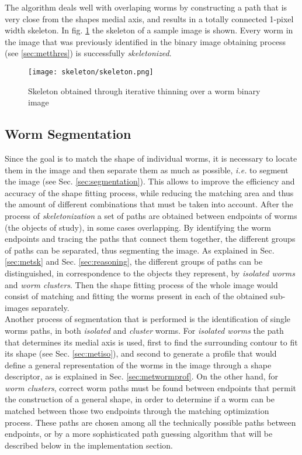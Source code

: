 The algorithm deals well with overlaping worms by constructing a path that is very close
from the shapes medial axis, and results in a totally connected 1-pixel width skeleton.
In fig. \ref{fig:skeleton} the skeleton of a sample image is shown. Every worm in the 
image that was previously identified in the binary image obtaining process 
(see \ref{sec:metthres}) is successfully \emph{skeletonized}.

\begin{figure}[h t b p ! H]
 \centering
   \texttt{[image: skeleton/skeleton.png]}
 \caption{Skeleton obtained through iterative thinning over a worm binary image}
\label{fig:skeleton}
\end{figure} 


\subsection{Worm Segmentation}
\label{sec:metsegmentation}

Since the goal is to match the shape of individual worms,
it is necessary to locate them in the image and then separate them 
as much as possible, \emph{i.e.} to segment the image (see Sec. \ref{sec:segmentation}). 
This allows to improve the efficiency and accuracy of the 
shape fitting process, while reducing the matching area and thus the amount of 
different combinations that must be taken into account. After the process of 
\emph{skeletonization} a set of paths are obtained 
between endpoints of worms (the objects of study), in some cases overlapping. 
By identifying the worm endpoints and tracing the paths that connect them together,
the different groups of paths can be separated, thus segmenting the image.
As explained in Sec. \ref{sec:metsk} and Sec. \ref{sec:reasoning}, the different groups
of paths can be distinguished, in correspondence to the objects they represent,
by \emph{isolated worms} and \emph{worm clusters}. Then the shape fitting process
of the whole image would consist of matching and fitting the worms present in each of
the obtained sub-images separately.\\

Another process of segmentation that is performed is the identification of single
worms paths, in both \emph{isolated} and \emph{cluster} worms. For \emph{isolated worms}
the path that determines its medial axis is used, first to find the surrounding contour to
fit its shape (see Sec. \ref{sec:metiso}), and second to generate a profile that 
would define a general representation of the worms in the image through a shape
descriptor, as is explained in Sec. \ref{sec:metwormprof}.
On the other hand, for \emph{worm clusters}, correct worm paths must be found between endpoints that
permit the construction of a general shape, in order to determine if a worm can be matched
between those two endpoints through the matching optimization process. These paths are chosen
among all the technically possible paths between endpoints, or by
a more sophisticated path guessing algorithm that will be described below in the
implementation section.



